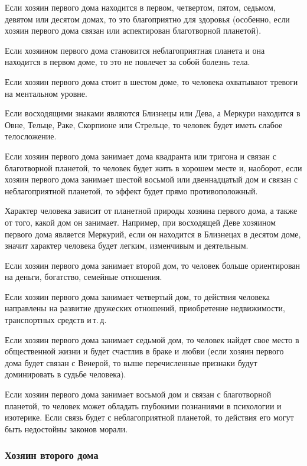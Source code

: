 Если хозяин первого дома находится в первом, четвертом, пятом, седьмом, девятом или десятом домах, то это благоприятно для здоровья (особенно, если хозяин первого дома связан или аспектирован благотворной планетой).

Если хозяином первого дома становится неблагоприятная планета и она находится в первом доме, то это не повлечет за собой болезнь тела.

Если хозяин первого дома стоит в шестом доме, то человека охватывают тревоги на ментальном уровне.

Если восходящими знаками являются Близнецы или Дева, а Меркури находится в Овне, Тельце, Раке, Скорпионе или Стрельце, то человек будет иметь слабое телосложение.

Если хозяин первого дома занимает дома квадранта или тригона и связан с благотворной планетой, то человек будет жить в хорошем месте и, наоборот, если хозяин первого дома занимает шестой восьмой или двеннадцатый дом и связан с неблагоприятной планетой, то эффект будет прямо противоположный.

Характер человека зависит от планетной природы хозяина первого дома, а также от того, какой дом он занимает. Например, при восходящей Деве хозяином первого дома является Меркурий, если он находится в Близнецах в десятом доме, значит характер человека будет легким, изменчивым и деятельным.

Если хозяин первого дома занимает второй дом, то человек больше ориентирован на деньги, богатство, семейные отношения.

Если хозяин первого дома занимает четвертый дом, то действия человека направлены на развитие дружеских отношений, приобретение недвижимости, транспортных средств и\,т.\,д.

Если хозяин первого дома занимает седьмой дом, то человек найдет свое место в общественной жизни и будет счастлив в браке и любви (если хозяин первого дома будет связан с Венерой, то выше перечисленные признаки будут доминировать в судьбе человека).

Если хозяин первого дома занимает восьмой дом и связан с благотворной планетой, то человек может обладать глубокими познаниями в психологии и изотерике. Если связь будет с неблагоприятной планетой, то действия его могут быть недостойны законов морали.

\subsubsection*{Хозяин второго дома}

